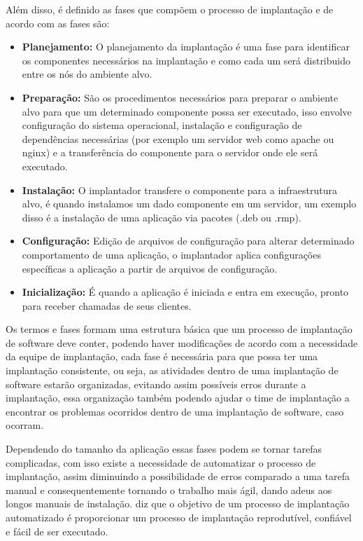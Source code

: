 Além disso, é definido as fases que compõem o processo de implantação e de acordo
com \cite{omg2006} as fases são:

\begin{itemize}
  \item  \textbf{Planejamento:} O planejamento da implantação é uma fase
  para identificar os componentes necessários na implantação e como cada um será
  distribuido entre os nós do ambiente alvo.
  \item  \textbf{Preparação:} São os procedimentos necessários para preparar o
  ambiente alvo para que um determinado componente possa ser executado, isso envolve
  configuração do sistema operacional, instalação e configuração de dependências
  necessárias (por exemplo um servidor web como apache ou nginx) e a transferência
  do componente para o servidor onde ele será executado.
  \item  \textbf{Instalação:} O implantador transfere o componente para a infraestrutura
  alvo, é quando instalamos um dado componente em um servidor, um exemplo disso
  é a instalação de uma aplicação via pacotes (.deb ou .rmp).
  \item  \textbf{Configuração:} Edição de arquivos de configuração para alterar
  determinado comportamento de uma aplicação, o implantador aplica configurações
  específicas a aplicação a partir de arquivos de configuração.
  \item  \textbf{Inicialização:} É quando a aplicação é iniciada e entra em execução,
  pronto para receber chamadas de seus clientes.
\end{itemize}

Os termos e fases formam uma estrutura básica que um processo de implantação de software
deve conter, podendo haver modificações de acordo com a necessidade da equipe de implantação,
cada fase é necessária para que possa ter uma implantação consistente, ou seja, as
atividades dentro de uma implantação de software estarão organizadas, evitando assim
possíveis erros durante a implantação, essa organização também podendo ajudar o
time de implantação a encontrar os problemas ocorridos dentro de uma implantação
de software, caso ocorram.

Dependendo do tamanho da aplicação essas fases podem se tornar tarefas complicadas,
com isso existe a necessidade de automatizar o processo de implantação, assim
diminuindo a possibilidade de erros comparado a uma tarefa manual e consequentemente
tornando o trabalho mais ágil, dando adeus aos longos manuais de instalação.
\cite{humble2010} diz que o objetivo de um processo de implantação automatizado é
proporcionar um processo de implantação reprodutível, confiável e fácil de ser
executado.

